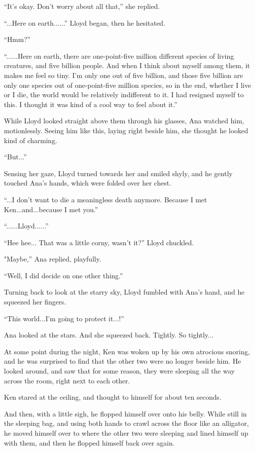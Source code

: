 \documentclass[
]{article}
\begin{document}
``It's okay. Don't worry about all that,'' she replied.

``...Here on earth......'' Lloyd began, then he hesitated.

``Hmm?''

``......Here on earth, there are one-point-five million different
species of living creatures, and five billion people. And when I think
about myself among them, it makes me feel so tiny. I'm only one out of
five billion, and those five billion are only one species out of
one-point-five million species, so in the end, whether I live or I die,
the world would be relatively indifferent to it. I had resigned myself
to this. I thought it was kind of a cool way to feel about it.''

While Lloyd looked straight above them through his glasses, Ana watched
him, motionlessly. Seeing him like this, laying right beside him, she
thought he looked kind of charming.

``But...''

Sensing her gaze, Lloyd turned towards her and smiled shyly, and he
gently touched Ana's hands, which were folded over her chest.

``...I don't want to die a meaningless death anymore. Because I met
Ken...and...because I met you.''

``......Lloyd......''

``Hee hee... That was a little corny, wasn't it?'' Lloyd chuckled.

"Maybe,'' Ana replied, playfully.

``Well, I did decide on one other thing.''

Turning back to look at the starry sky, Lloyd fumbled with Ana's hand,
and he squeezed her fingers.

``This world...I'm going to protect it...!''

Ana looked at the stars. And she squeezed back. Tightly. So tightly...

At some point during the night, Ken was woken up by his own atrocious
snoring, and he was surprised to find that the other two were no longer
beside him. He looked around, and saw that for some reason, they were
sleeping all the way across the room, right next to each other.

Ken stared at the ceiling, and thought to himself for about ten seconds.

And then, with a little sigh, he flopped himself over onto his belly.
While still in the sleeping bag, and using both hands to crawl across
the floor like an alligator, he moved himself over to where the other
two were sleeping and lined himself up with them, and then he flopped
himself back over again.
\end{document}
